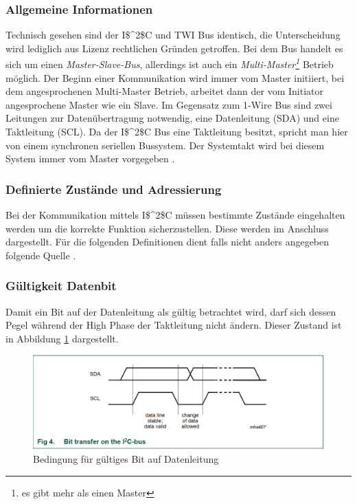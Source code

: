 \subsubsection*{Allgemeine Informationen}
\label{subsubsection_Allgemeine_Informationen_I2C}
Technisch gesehen sind der \ac{I$^2$C} und \ac{TWI} Bus identisch, die Unterscheidung wird lediglich aus Lizenz rechtlichen Gründen getroffen. Bei dem Bus handelt es sich um einen \textit{Master-Slave-Bus}, allerdings ist auch ein \textit{Multi-Master\footnote{es gibt mehr als einen Master}} Betrieb möglich. Der Beginn einer Kommunikation wird immer vom Master initiiert, bei dem angesprochenen Multi-Master Betrieb, arbeitet dann der vom Initiator angesprochene Master wie ein Slave. Im Gegensatz zum 1-Wire Bus sind zwei Leitungen zur Datenübertragung notwendig, eine Datenleitung (SDA) und eine Taktleitung (SCL). Da der \ac{I$^2$C} Bus eine Taktleitung besitzt, spricht man hier von einem synchronen seriellen Bussystem. Der Systemtakt wird bei diesem System immer vom Master vorgegeben \citep{Bussysteme_in_der_Praxis}. 

\subsubsection*{Definierte Zustände und Adressierung}
\label{subsubsection_definierte_Zustände_Adressierung}
Bei der Kommunikation mittels \ac{I$^2$C} müssen bestimmte Zustände eingehalten werden um die korrekte Funktion sicherzustellen. Diese werden im Anschluss dargestellt. Für die folgenden Definitionen dient falls nicht anders angegeben folgende Quelle \citep{I2C_Datenblatt}.
\subsubsection*{Gültigkeit Datenbit}
\label{subsubsection_Gültigkeit_Datenbit}
Damit ein Bit auf der Datenleitung als gültig betrachtet wird, darf sich dessen Pegel während der High Phase der Taktleitung nicht ändern. Dieser Zustand ist in Abbildung \ref{Abb_Bild_I2C_data_valid} dargestellt.

\begin{figure}[!h] 
  \centering
     \includegraphics[scale=.65]{BilderAllgemein/I2C_data_valid.png}
  \caption{Bedingung für gültiges Bit auf Datenleitung \citep[S. 9]{I2C_Datenblatt}}
  \label{Abb_Bild_I2C_data_valid}
\end{figure}

